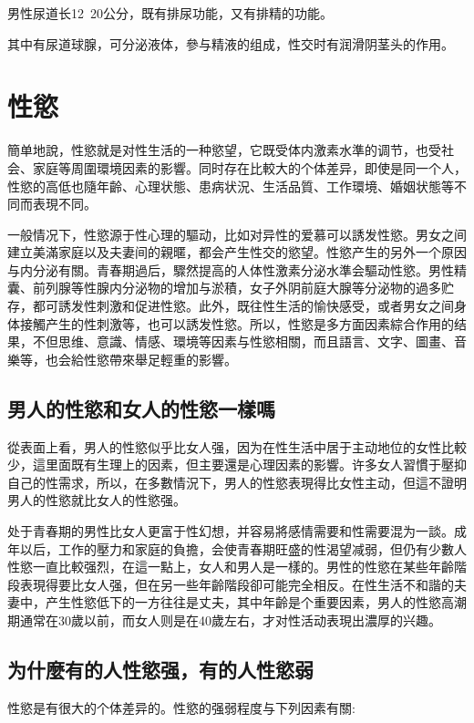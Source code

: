 \documentclass[12pt,UTF8]{ctexbook}
\begin{document}
男性尿道长12~20公分，既有排尿功能，又有排精的功能。

其中有尿道球腺，可分泌液体，參与精液的组成，性交时有润滑阴茎头的作用。

\chapter{性慾}

簡单地說，性慾就是对性生活的一种慾望，它既受体内激素水準的调节，也受社会、家庭等周圍環境因素的影響。同时存在比較大的个体差异，即使是同一个人，性慾的高低也隨年齡、心理状態、患病状況、生活品質、工作環境、婚姻状態等不同而表現不同。

一般情况下，性慾源于性心理的驅动，比如对异性的爱慕可以誘发性慾。男女之间建立美滿家庭以及夫妻间的親暱，都会产生性交的慾望。性慾产生的另外一个原因与内分泌有關。青春期過后，驟然提高的人体性激素分泌水準会驅动性慾。男性精囊、前列腺等性腺内分泌物的增加与淤積，女子外阴前庭大腺等分泌物的過多贮存，都可誘发性刺激和促进性慾。此外，既往性生活的愉快感受，或者男女之间身体接觸产生的性刺激等，也可以誘发性慾。所以，性慾是多方面因素綜合作用的结果，不但思维、意識、情感、環境等因素与性慾相關，而且語言、文字、圖畫、音樂等，也会給性慾帶來舉足輕重的影響。

\section{男人的性慾和女人的性慾一樣嗎}

從表面上看，男人的性慾似乎比女人强，因为在性生活中居于主动地位的女性比較少，這里面既有生理上的因素，但主要還是心理因素的影響。许多女人習慣于壓抑自己的性需求，所以，在多數情況下，男人的性慾表現得比女性主动，但這不證明男人的性慾就比女人的性慾强。

处于青春期的男性比女人更富于性幻想，并容易將感情需要和性需要混为一談。成年以后，工作的壓力和家庭的負擔，会使青春期旺盛的性渴望减弱，但仍有少數人性慾一直比較强烈，在這一點上，女人和男人是一樣的。男性的性慾在某些年齡階段表現得要比女人强，但在另一些年齡階段卻可能完全相反。在性生活不和諧的夫妻中，产生性慾低下的一方往往是丈夫，其中年齡是个重要因素，男人的性慾高潮期通常在30歲以前，而女人则是在40歲左右，才对性活动表現出濃厚的兴趣。

\section{为什麼有的人性慾强，有的人性慾弱}

性慾是有很大的个体差异的。性慾的强弱程度与下列因素有關:
\end{document}
